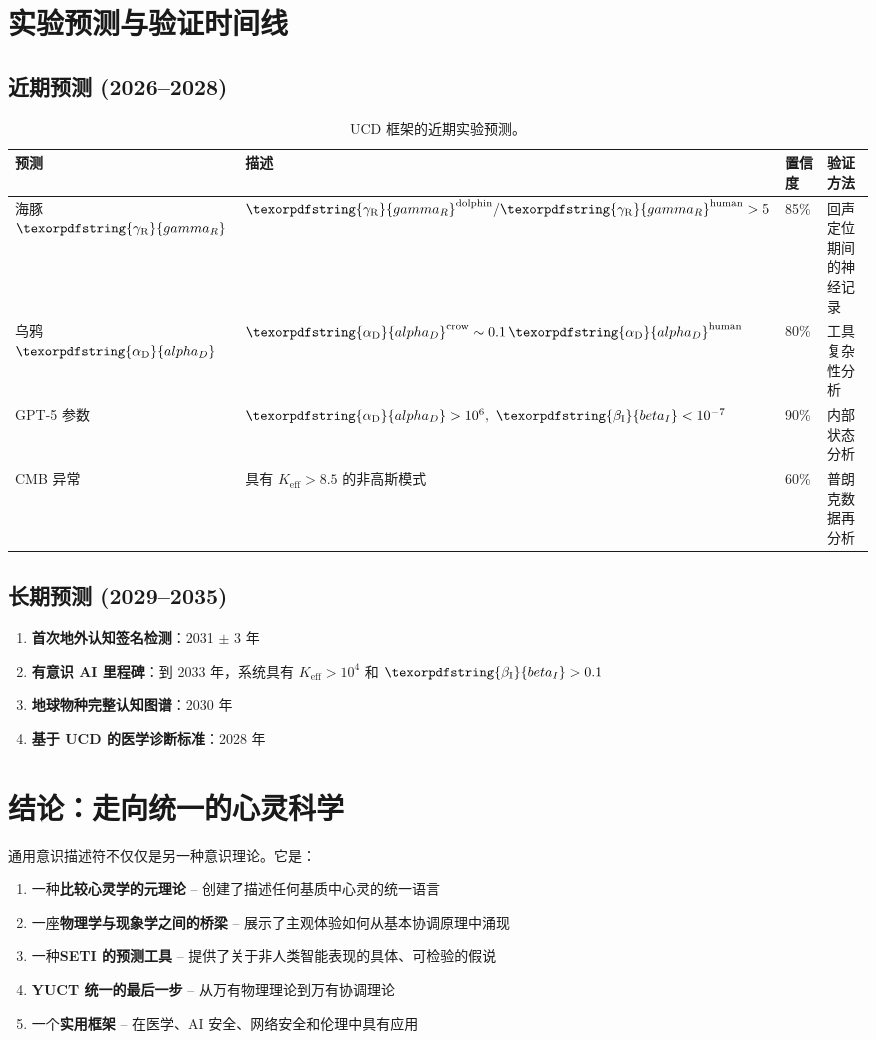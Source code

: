 \documentclass[11pt,a4paper]{article}
\DeclareRobustCommand{\alD}{\texorpdfstring{\ensuremath{\alpha_{\mathrm{D}}}}{alpha_D}}
\DeclareRobustCommand{\beI}{\texorpdfstring{\ensuremath{\beta_{\mathrm{I}}}}{beta_I}}
\DeclareRobustCommand{\gaR}{\texorpdfstring{\ensuremath{\gamma_{\mathrm{R}}}}{gamma_R}}
\newcommand{\eff}{\mathrm{eff}}
\newcommand{\Ke}{K_{\eff}}
\begin{document}
	\section{实验预测与验证时间线}
	
	\subsection{近期预测 (2026--2028)}
	
	\begin{table}[ht]
		\centering
		\begin{tabular}{lp{}lp{}}
			\toprule
			\textbf{预测} & \textbf{描述} & \textbf{置信度} & \textbf{验证方法} \\
			\midrule
			海豚 \(\gaR\) & \(\gaR^{\mathrm{dolphin}}/\gaR^{\mathrm{human}} > 5\) & 85\% & 回声定位期间的神经记录 \\
			乌鸦 \(\alD\) & \(\alD^{\mathrm{crow}} \sim 0.1\,\alD^{\mathrm{human}}\) & 80\% & 工具复杂性分析 \\
			GPT-5 参数 & \(\alD > 10^6,\ \beI < 10^{-7}\) & 90\% & 内部状态分析 \\
			CMB 异常 & 具有 \(\Ke > 8.5\) 的非高斯模式 & 60\% & 普朗克数据再分析 \\
			\bottomrule
		\end{tabular}
		\caption{UCD 框架的近期实验预测。}
		\label{tab:near-term-predictions}
	\end{table}
	
	\subsection{长期预测 (2029--2035)}
	
	\begin{enumerate}
		\item \textbf{首次地外认知签名检测}：2031 \(\pm\) 3 年
		\item \textbf{有意识 AI 里程碑}：到 2033 年，系统具有 \(\Ke > 10^4\) 和 \(\beI > 0.1\)
		\item \textbf{地球物种完整认知图谱}：2030 年
		\item \textbf{基于 UCD 的医学诊断标准}：2028 年
	\end{enumerate}
	
	\section{结论：走向统一的心灵科学}
	
	通用意识描述符不仅仅是另一种意识理论。它是：
	\begin{enumerate}
		\item 一种\textbf{比较心灵学的元理论} -- 创建了描述任何基质中心灵的统一语言
		\item 一座\textbf{物理学与现象学之间的桥梁} -- 展示了主观体验如何从基本协调原理中涌现
		\item 一种\textbf{SETI 的预测工具} -- 提供了关于非人类智能表现的具体、可检验的假说
		\item \textbf{YUCT 统一的最后一步} -- 从万有物理理论到万有协调理论
		\item 一个\textbf{实用框架} -- 在医学、AI 安全、网络安全和伦理中具有应用
	\end{enumerate}
	
\end{document}
